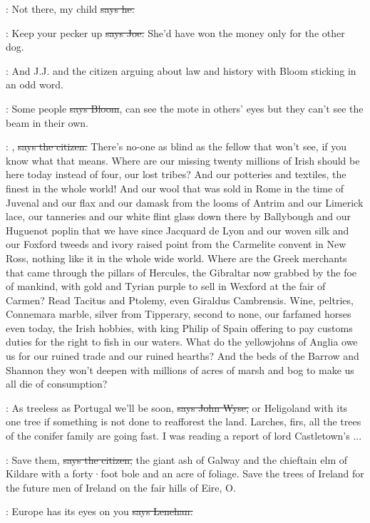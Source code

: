\lenehan:
Not there,
my child
\sout{says he.}

\joe:
Keep your pecker up
\sout{says Joe.}
She'd have won the money only for the
other dog.

\Nq:
And J.J.
and the citizen arguing about law and history with Bloom
sticking in an odd word.

\Bloom:
Some people
\sout{says Bloom},
can see the mote in others' eyes but they can't
see the beam in their own.

\citizen:
,
\sout{says the citizen.}
There's no-one as blind as the fellow that
won't see,
if you know what that means.
Where are our missing
twenty millions of Irish should be here today instead of four,
our lost tribes?
And our potteries and textiles,
the finest in
the whole world!
And our wool that was sold in Rome in the time
of Juvenal and our flax and our damask from the looms of Antrim
and our Limerick lace,
our tanneries and our white flint glass
down there by Ballybough and our Huguenot poplin that we have since
Jacquard de Lyon and our woven silk and our Foxford tweeds and ivory
raised point from the Carmelite convent in New Ross,
nothing like it in
the whole wide world.
Where are the Greek merchants that came through the
pillars of Hercules,
the Gibraltar now grabbed by the foe of mankind,
with
gold and Tyrian purple to sell in Wexford at the fair of Carmen?
Read
Tacitus and Ptolemy,
even Giraldus Cambrensis.
Wine,
peltries,
Connemara marble,
silver from Tipperary,
second to none,
our farfamed
horses even today,
the Irish hobbies,
with king Philip of Spain offering
to pay customs duties for the right to fish in our waters.
What do the
yellowjohns of Anglia owe us for our ruined trade and our ruined hearths?
And the beds of the Barrow and Shannon they won't deepen with millions
of acres of marsh and bog to make us all die of consumption?

\johnwyse:
As treeless as Portugal we'll be soon,
\sout{says John Wyse,} or Heligoland
with its one tree if something is not done to reafforest the land.
Larches,
firs,
all the trees of the conifer family are going fast.
I was
reading a report of lord Castletown's ...

\citizen:
Save them,
\sout{says the citizen,}
the giant ash of Galway and the chieftain
elm of Kildare with a forty·foot bole and an acre of foliage.
Save the
trees of Ireland for the future men of Ireland on the fair hills of
Eire,
O.

\lenehan:
Europe has its eyes on you
\sout{says Lenehan.}


